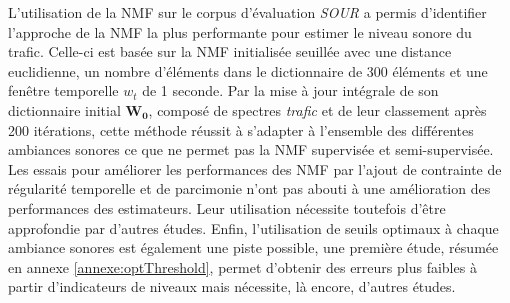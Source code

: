 L'utilisation de la NMF sur le corpus d'évaluation \textit{SOUR} a permis d'identifier l'approche de la NMF la plus performante pour estimer le niveau sonore du trafic. Celle-ci est basée sur la NMF initialisée seuillée avec une distance euclidienne, un nombre d'éléments dans le dictionnaire de 300 éléments et une fenêtre temporelle $w_t$ de 1 seconde. Par la mise à jour intégrale de son dictionnaire initial $\mathbf{W_0}$, composé de spectres \textit{trafic} et de leur classement après 200 itérations, cette méthode réussit à s'adapter à l'ensemble des différentes ambiances sonores ce que ne permet pas la NMF supervisée et semi-supervisée. Les essais pour améliorer les performances des NMF par l'ajout de contrainte de régularité temporelle et de parcimonie n'ont pas abouti à une amélioration des performances des estimateurs. Leur utilisation nécessite toutefois d'être approfondie par d'autres études. Enfin, l'utilisation de seuils optimaux à chaque ambiance sonores est également une piste possible, une première étude, résumée en annexe \ref{annexe:optThreshold}, permet d'obtenir des erreurs plus faibles à partir d'indicateurs de niveaux mais nécessite, là encore, d'autres études. 

%